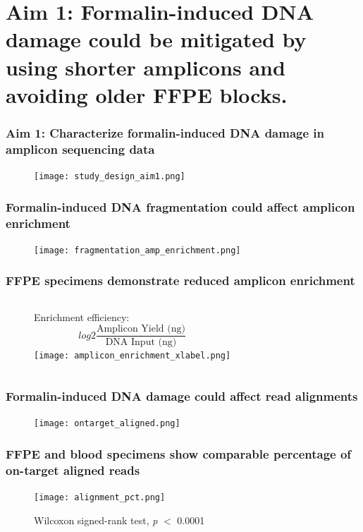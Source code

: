 \documentclass{beamer}
\begin{document}
\section[Aim 1]{Aim 1: Formalin-induced DNA damage could be mitigated by using shorter amplicons and avoiding older FFPE blocks.}

\begin{frame}
\frametitle{Aim 1: Characterize formalin-induced DNA damage in amplicon sequencing data}
\begin{figure}[t]
    \texttt{[image: study\_design\_aim1.png]}
\end{figure}
\end{frame}

\begin{frame}
\frametitle{Formalin-induced DNA fragmentation could affect amplicon enrichment}
\begin{figure}[t]
    \texttt{[image: fragmentation\_amp\_enrichment.png]}
\end{figure}
\end{frame}

\begin{frame}
\frametitle{FFPE specimens demonstrate reduced amplicon enrichment}
\begin{figure}[t]
    \begin{columns}
    \column{5cm}
    \centering
    Enrichment efficiency:
    \[
    log2\frac{\text{Amplicon Yield (ng)}}{\text{DNA Input (ng)}}
    \]%
    \column{7cm}
    \centering
    \texttt{[image: amplicon\_enrichment\_xlabel.png]}
    \end{columns}
\end{figure}
\end{frame}

\begin{frame}
\frametitle{Formalin-induced DNA damage could affect read alignments}
\begin{figure}[t]
    \texttt{[image: ontarget\_aligned.png]}
\end{figure}
\end{frame}

\begin{frame}
\frametitle{FFPE and blood specimens show comparable percentage of on-target aligned reads}
\begin{figure}[t]
    \texttt{[image: alignment\_pct.png]}
    \vspace{-4mm}
    \caption{\scriptsize Wilcoxon signed-rank test, \textit{p} $<$ 0.0001}
\end{figure}
\end{frame}
\end{document}
